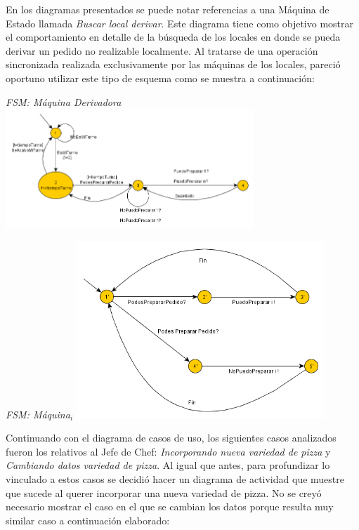 \documentclass[a4paper,11pt] {article}
\begin{document}
En los diagramas presentados se puede notar referencias a una M\'aquina de Estado llamada \textit{Buscar local derivar}. Este diagrama tiene como objetivo mostrar el comportamiento en detalle de la b\'usqueda de los locales en donde se pueda derivar un pedido no realizable localmente. Al tratarse de una operaci\'on sincronizada realizada exclusivamente por las m\'aquinas de los locales, pareci\'o oportuno utilizar este tipo de esquema como se muestra a continuaci\'on:

\begin{center}
 \textit{FSM: M\'aquina Derivadora}
 \includegraphics[width=0.7\textwidth]{Diagramas/FSMPrepararPedido.png}
\end{center}
\begin{center}
 \textit{FSM: M\'aquina$_{i}$}
 \includegraphics[width=0.7\textwidth]{Diagramas/FSMPrepararPedidoi.png}
\end{center}

Continuando con el diagrama de casos de uso, los siguientes casos analizados fueron los relativos al Jefe de Chef: \textit{Incorporando nueva variedad de pizza} y \textit{Cambiando datos variedad de pizza}. Al igual que antes, para profundizar lo vinculado a estos casos se decidi\'o hacer un diagrama de actividad que muestre que sucede al querer incorporar una nueva variedad de pizza. No se crey\'o necesario mostrar el caso en el que se cambian los datos porque resulta muy similar caso a continuaci\'on elaborado:
\end{document}
